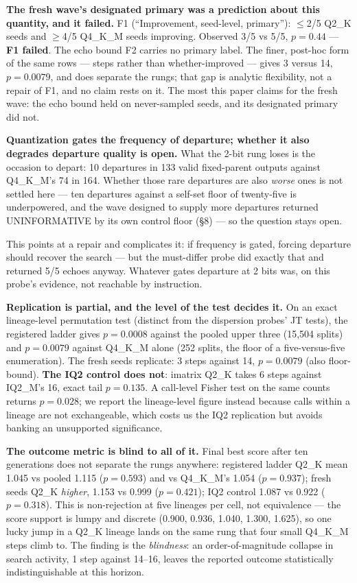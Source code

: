 \textbf{The fresh wave's designated primary was a prediction about this quantity, and it failed.} F1 (``Improvement, seed-level, primary''): $\le$2/5 Q2\_K seeds and $\ge$4/5 Q4\_K\_M seeds improving. Observed 3/5 vs 5/5, $p = 0.44$ --- \textbf{F1 failed}. The echo bound F2 carries no primary label. The finer, post-hoc form of the same rows --- steps rather than whether-improved --- gives 3 versus 14, $p = 0.0079$, and does separate the rungs; that gap is analytic flexibility, not a repair of F1, and no claim rests on it. The most this paper claims for the fresh wave: the echo bound held on never-sampled seeds, and its designated primary did not.

\textbf{Quantization gates the frequency of departure; whether it also degrades departure quality is open.} What the 2-bit rung loses is the occasion to depart: 10 departures in 133 valid fixed-parent outputs against Q4\_K\_M's 74 in 164. Whether those rare departures are also \emph{worse} ones is not settled here --- ten departures against a self-set floor of twenty-five is underpowered, and the wave designed to supply more departures returned UNINFORMATIVE by its own control floor (\S8) --- so the question stays open.

This points at a repair and complicates it: if frequency is gated, forcing departure should recover the search --- but the must-differ probe did exactly that and returned 5/5 echoes anyway. Whatever gates departure at 2 bits was, on this probe's evidence, not reachable by instruction.

\textbf{Replication is partial, and the level of the test decides it.} On an exact lineage-level permutation test (distinct from the dispersion probes' JT tests), the registered ladder gives $p = 0.0008$ against the pooled upper three (15,504 splits) and $p = 0.0079$ against Q4\_K\_M alone (252 splits, the floor of a five-versus-five enumeration). The fresh seeds replicate: 3 steps against 14, $p = 0.0079$ (also floor-bound). \textbf{The IQ2 control does not}: imatrix Q2\_K takes 6 steps against IQ2\_M's 16, exact tail $p = 0.135$. A call-level Fisher test on the same counts returns $p = 0.028$; we report the lineage-level figure instead because calls within a lineage are not exchangeable, which costs us the IQ2 replication but avoids banking an unsupported significance.

\textbf{The outcome metric is blind to all of it.} Final best score after ten generations does not separate the rungs anywhere: registered ladder Q2\_K mean 1.045 vs pooled 1.115 ($p = 0.593$) and vs Q4\_K\_M's 1.054 ($p = 0.937$); fresh seeds Q2\_K \emph{higher}, 1.153 vs 0.999 ($p = 0.421$); IQ2 control 1.087 vs 0.922 ($p = 0.318$). This is non-rejection at five lineages per cell, not equivalence --- the score support is lumpy and discrete (0.900, 0.936, 1.040, 1.300, 1.625), so one lucky jump in a Q2\_K lineage lands on the same rung that four small Q4\_K\_M steps climb to. The finding is the \emph{blindness}: an order-of-magnitude collapse in search activity, 1 step against 14--16, leaves the reported outcome statistically indistinguishable at this horizon.

